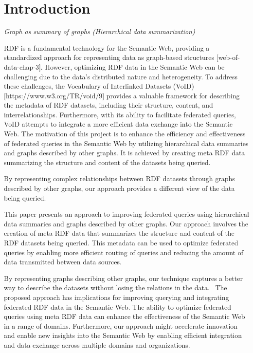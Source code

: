 \section{Introduction}\label{sec:introduction1}
\emph{Graph as summary of graphs (Hierarchical data summarization)}

RDF is a fundamental technology for the Semantic Web, providing a standardized approach for representing data as graph-based structures [web-of-data-chap-3]. However, optimizing RDF data in the Semantic Web can be challenging due to the data's distributed nature and heterogeneity. To address these challenges, the Vocabulary of Interlinked Datasets (VoID) [https://www.w3.org/TR/void/9] provides a valuable framework for describing the metadata of RDF datasets, including their structure, content, and interrelationships. Furthermore, with its ability to facilitate federated queries, VoID attempts to integrate a more efficient data exchange into the Semantic Web. The motivation of this project is to enhance the efficiency and effectiveness of federated queries in the Semantic Web by utilizing hierarchical data summaries and graphs described by other graphs. It is achieved by creating meta RDF data summarizing the structure and content of the datasets being queried. 

By representing complex relationships between RDF datasets through graphs described by other graphs, our approach provides a different view of the data being queried.

This paper presents an approach to improving federated queries using hierarchical data summaries and graphs described by other graphs. Our approach involves the creation of meta RDF data that summarizes the structure and content of the RDF datasets being queried. This metadata can be used to optimize federated queries by enabling more efficient routing of queries and reducing the amount of data transmitted between data sources. 

By representing graphs describing other graphs, our technique captures a better way to describe the datasets without losing the relations in the data. 
The proposed approach has implications for improving querying and integrating federated RDF data in the Semantic Web. The ability to optimize federated queries using meta RDF data can enhance the effectiveness of the Semantic Web in a range of domains. Furthermore, our approach might accelerate innovation and enable new insights into the Semantic Web by enabling efficient integration and data exchange across multiple domains and organizations.